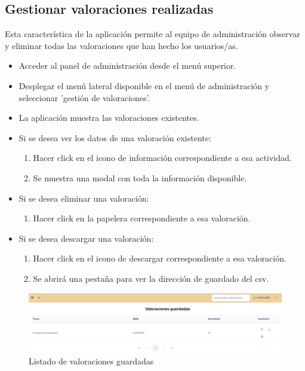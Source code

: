 \subsection{Gestionar valoraciones realizadas}
Esta característica de la aplicación permite al equipo de administración observar y eliminar todas las valoraciones que han hecho los usuarios/as.

\begin{itemize}
    \item Acceder al panel de administración desde el menú superior.
    \item Desplegar el menú lateral disponible en el menú de administración y seleccionar 'gestión de valoraciones'.
    \item La aplicación muestra las valoraciones existentes.
    \item Si se desea ver los datos de una valoración existente:
    \begin{enumerate}
        \item Hacer click en el icono de información correspondiente a esa actividad.
        \item Se muestra una modal con toda la información disponible.
    \end{enumerate}
    \item Si se desea eliminar una valoración:
    \begin{enumerate}
        \item Hacer click en la papelera correspondiente a esa valoración.
    \end{enumerate}
    \item Si se desea descargar una valoración:
    \begin{enumerate}
        \item Hacer click en el icono de descargar correspondiente a esa valoración.
        \item Se abrirá una pestaña para ver la dirección de guardado del csv.
    \end{enumerate}
\end{itemize}

\begin{figure}[h]
    \centering
    \includegraphics[width=1\linewidth]{Imagenes/ManualValoracionesGuardadas.png}
    \caption{Listado de valoraciones guardadas}
    \label{Listado de valoraciones guardadas}
\end{figure}
\FloatBarrier